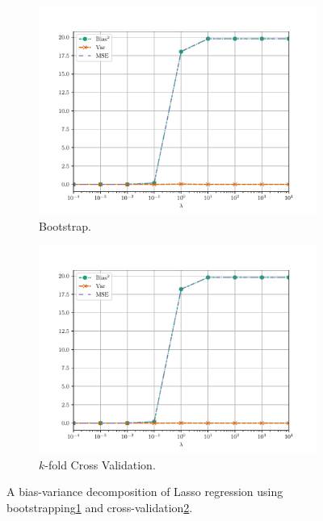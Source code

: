\begin{figure}[H]
    \centering
    \begin{subfigure}[b]{0.5\textwidth}
        \centering
        \includegraphics[scale=0.5]{../fig/lasso_bs_bias_variance_analysis.pdf}
        \caption{Bootstrap.}
        \label{fig:linreg-bias-variance-decomp-bs-lasso}
    \end{subfigure}%
    \begin{subfigure}[b]{0.5\textwidth}
        \centering
        \includegraphics[scale=0.5]{../fig/lasso_cv_bias_variance_analysis.pdf}
        \caption{$k$-fold Cross Validation.}
        \label{fig:linreg-bias-variance-decomp-cv-lasso}
    \end{subfigure}
    \caption{A bias-variance decomposition of Lasso regression using bootstrapping\ref{fig:linreg-bias-variance-decomp-bs-lasso} and cross-validation\ref{fig:linreg-bias-variance-decomp-cv-lasso}.}
    \label{fig:linreg-bias-variance-decomp-lasso}
\end{figure}


